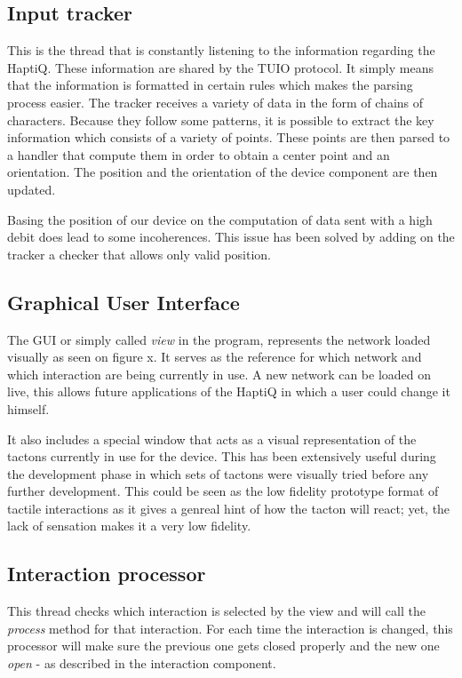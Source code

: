 \subsection{Input tracker}\label{input-tracker}

This is the thread that is constantly listening to the information
regarding the HaptiQ. These information are shared by the TUIO protocol.
It simply means that the information is formatted in certain rules which
makes the parsing process easier. The tracker receives a variety of data
in the form of chains of characters. Because they follow some patterns,
it is possible to extract the key information which consists of a
variety of points. These points are then parsed to a handler that
compute them in order to obtain a center point and an orientation. The
position and the orientation of the device component are then updated.

Basing the position of our device on the computation of data sent with a
high debit does lead to some incoherences. This issue has been solved by
adding on the tracker a checker that allows only valid position.

\subsection{Graphical User Interface}\label{graphical-user-interface}

The GUI or simply called \emph{view} in the program, represents the
network loaded visually as seen on figure x. It serves as the reference
for which network and which interaction are being currently in use. A
new network can be loaded on live, this allows future applications of
the HaptiQ in which a user could change it himself.

It also includes a special window that acts as a visual representation
of the tactons currently in use for the device. This has been
extensively useful during the development phase in which sets of tactons
were visually tried before any further development. This could be seen
as the low fidelity prototype format of tactile interactions as it gives
a genreal hint of how the tacton will react; yet, the lack of sensation
makes it a very low fidelity.

\subsection{Interaction processor}\label{interaction-processor}

This thread checks which interaction is selected by the view and will
call the \emph{process} method for that interaction. For each time the
interaction is changed, this processor will make sure the previous one
gets closed properly and the new one \emph{open} - as described in the
interaction component.

